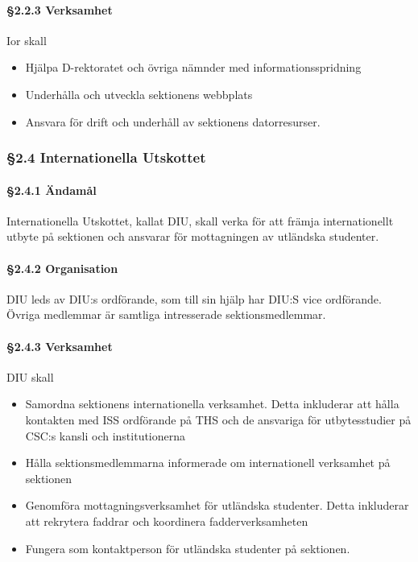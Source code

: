 \paragraph{§2.2.3 Verksamhet}

Ior skall

\begin{itemize}
  \item Hjälpa D-rektoratet och övriga nämnder med informationsspridning
  \item Underhålla och utveckla sektionens webbplats
  \item Ansvara för drift och underhåll av sektionens datorresurser.
\end{itemize}

\subsubsection{§2.4 Internationella Utskottet}

\paragraph{§2.4.1 Ändamål}

Internationella Utskottet, kallat DIU, skall verka för att främja internationellt utbyte på sektionen och ansvarar för mottagningen av utländska studenter.

\paragraph{§2.4.2 Organisation}

DIU leds av DIU:s ordförande, som till sin hjälp har DIU:S vice ordförande. Övriga medlemmar är samtliga intresserade sektionsmedlemmar.

\paragraph{§2.4.3 Verksamhet}

DIU skall

\begin{itemize}
  \item Samordna sektionens internationella verksamhet. Detta inkluderar att hålla kontakten med ISS ordförande på THS och de ansvariga för utbytesstudier på CSC:s kansli och institutionerna
  \item Hålla sektionsmedlemmarna informerade om internationell verksamhet på sektionen
  \item Genomföra mottagningsverksamhet för utländska studenter. Detta inkluderar att rekrytera faddrar och koordinera fadderverksamheten
  \item Fungera som kontaktperson för utländska studenter på sektionen.
\end{itemize}

